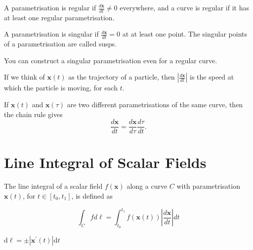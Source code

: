 \begin{ndefi}
	A parametrisation is regular if $\frac{d \boldsymbol{x}}{d t} \neq 0$ everywhere, and a curve is regular if it has at least one regular parametrisation.
\end{ndefi}

\begin{ndefi}
	
	A parametrisation is singular if $\frac{d \boldsymbol{x}}{d t} = 0$ at at least one point. The singular points of a parametrisation are called susps.
	
\end{ndefi}

\begin{nrem}
	You can construct a singular parametrisation even for a regular curve.
\end{nrem}


\begin{remark}
  If we think of $\boldsymbol{x}(t)$ as the trajectory of a particle, then $\left|\frac{d \boldsymbol{x}}{d t}\right|$ is the speed at which the particle is moving, for each $t$.
\end{remark}

\begin{theorem}
 If $\boldsymbol{x}(t)$ and $\boldsymbol{x}(\tau)$ are two different parametrisations of the same curve, then the chain rule gives
$$
\frac{d \boldsymbol{x}}{d t}=\frac{d \boldsymbol{x}}{d \tau} \frac{d \tau}{d t} .
$$ 
\end{theorem}

\section{Line Integral of Scalar Fields}

\begin{definition}
  The line integral of a scalar field $f(\boldsymbol{x})$ along a curve $C$ with parametrisation $\boldsymbol{x}(t)$, for $t \in\left[t_0, t_1\right]$, is defined as

$$
\int_C f d \ell=\int_{t_0}^{t_1} f(\boldsymbol{x}(t))\left|\frac{d \boldsymbol{x}}{d t}\right| d t
$$
\end{definition}

\begin{nprop}
	$\mathrm{d} \ell = \pm\left|\mathbf{x}^{\prime}(t)\right| \mathrm{d} t$
\end{nprop}

